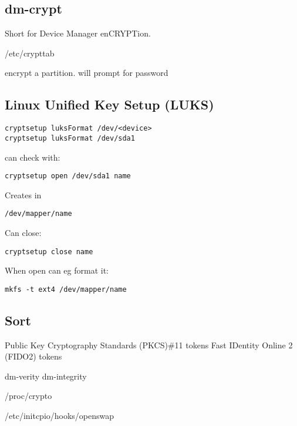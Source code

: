 

\subsection{dm-crypt}

Short for Device Manager enCRYPTion.

/etc/crypttab

encrypt a partition. will prompt for password


\subsection{Linux Unified Key Setup (LUKS)}

\begin{verbatim}
cryptsetup luksFormat /dev/<device>
cryptsetup luksFormat /dev/sda1
\end{verbatim}


can check with:

\begin{verbatim}
cryptsetup open /dev/sda1 name
\end{verbatim}
Creates in
\begin{verbatim}
/dev/mapper/name
\end{verbatim}

Can close:
\begin{verbatim}
cryptsetup close name
\end{verbatim}

When open can eg format it:

\begin{verbatim}
mkfs -t ext4 /dev/mapper/name
\end{verbatim}

\subsection{Sort}

Public Key Cryptography Standards (PKCS)\#11 tokens
Fast IDentity Online 2 (FIDO2) tokens


dm-verity
dm-integrity

/proc/crypto



/etc/initcpio/hooks/openswap

